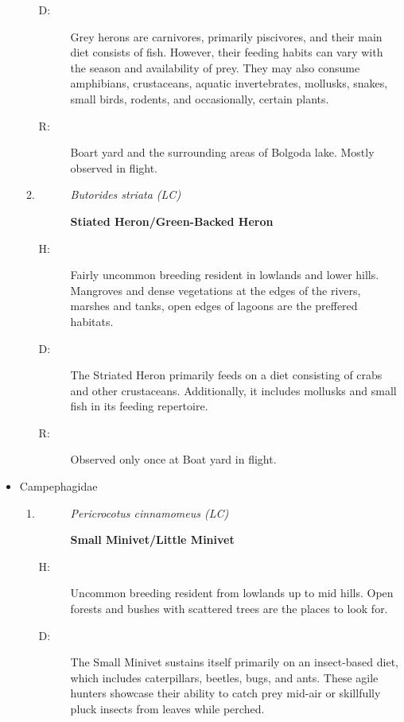 \begin{itemize}
\begin{enumerate}
\begin{description}
\item[D: ]%
Grey herons are carnivores, primarily piscivores, and their main diet consists of fish. However, their feeding habits can vary with the season and availability of prey. They may also consume amphibians, crustaceans, aquatic invertebrates, mollusks, snakes, small birds, rodents, and occasionally, certain plants.%
\item[R: ]%
Boart yard and the surrounding areas of Bolgoda lake. Mostly observed in flight.%
\end{description}%
\item%
\begin{description}%
\item[]%
\textit{Butorides striata (LC)}%
\item[]%
\textbf{Stiated Heron/Green{-}Backed Heron}%
\end{description}%
\begin{description}%
\item[H: ]%
Fairly uncommon breeding resident in lowlands and lower hills. Mangroves and dense vegetations at the edges of the rivers, marshes and tanks, open edges of lagoons are the preffered habitats.%
\item[D: ]%
The Striated Heron primarily feeds on a diet consisting of crabs and other crustaceans. Additionally, it includes mollusks and small fish in its feeding repertoire.%
\item[R: ]%
Observed only once at Boat yard in flight.%
\end{description}%
\end{enumerate}%
\item%
Campephagidae%
\begin{enumerate}%
\item%
\begin{description}%
\item[]%
\textit{Pericrocotus cinnamomeus (LC)}%
\item[]%
\textbf{Small Minivet/Little Minivet}%
\end{description}%
\begin{description}%
\item[H: ]%
Uncommon breeding resident from lowlands up to mid hills. Open forests and bushes with scattered trees are the places to look for.%
\item[D: ]%
The Small Minivet sustains itself primarily on an insect{-}based diet, which includes caterpillars, beetles, bugs, and ants. These agile hunters showcase their ability to catch prey mid{-}air or skillfully pluck insects from leaves while perched.%

\end{description}
\end{enumerate}
\end{itemize}

